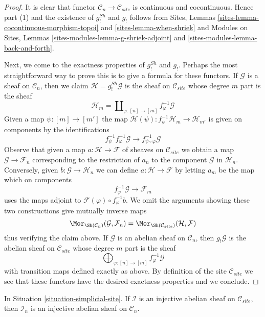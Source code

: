 \begin{proof}
It is clear that functor $\mathcal{C}_n \to \mathcal{C}_{site}$ is
continuous and cocontinuous. Hence part (1) and the existence
of $g^{Sh}_!$ and $g_!$ follows from
Sites, Lemmas \ref{sites-lemma-cocontinuous-morphism-topoi} and
\ref{sites-lemma-when-shriek}
and
Modules on Sites, Lemmas \ref{sites-modules-lemma-g-shriek-adjoint} and
\ref{sites-modules-lemma-back-and-forth}.

\medskip\noindent
Next, we come to the exactness properties of $g^{Sh}_!$ and $g_!$.
Perhaps the most straightforward way to prove this is to give a formula
for these functors. If $\mathcal{G}$ is a sheaf on $\mathcal{C}_n$,
then we claim $\mathcal{H} = g^{Sh}_!\mathcal{G}$ is the sheaf on
$\mathcal{C}_{site}$ whose degree $m$ part is the sheaf
$$
\mathcal{H}_m = \coprod\nolimits_{\varphi : [n] \to [m]}
f_\varphi^{-1}\mathcal{G}
$$
Given a map $\psi : [m] \to [m']$ the map
$\mathcal{H}(\psi) : f_\psi^{-1}\mathcal{H}_m \to \mathcal{H}_{m'}$
is given on components by the identifications
$$
f_\psi^{-1} f_\varphi^{-1} \mathcal{G} \to
f_{\psi \circ \varphi}^{-1}\mathcal{G}
$$
Observe that given a map $a : \mathcal{H} \to \mathcal{F}$ of sheaves on
$\mathcal{C}_{site}$ we obtain a map $\mathcal{G} \to \mathcal{F}_n$
corresponding to the restriction of $a_n$ to the component
$\mathcal{G}$ in $\mathcal{H}_n$. Conversely, given
$b : \mathcal{G} \to \mathcal{H}_n$ we can define
$a : \mathcal{H} \to \mathcal{F}$ by letting $a_m$ be the map which
on components
$$
f_\varphi^{-1}\mathcal{G} \to \mathcal{F}_m
$$
uses the maps adjoint to $\mathcal{F}(\varphi) \circ f_\varphi^{-1}b$.
We omit the arguments showing these two constructions give
mutually inverse maps
$$
\Mor_{\Sh(\mathcal{C}_n)}(\mathcal{G}, \mathcal{F}_n) =
\Mor_{\Sh(\mathcal{C}_{site})}(\mathcal{H}, \mathcal{F})
$$
thus verifying the claim above.
If $\mathcal{G}$ is an abelian sheaf on $\mathcal{C}_n$,
then $g_!\mathcal{G}$ is the abelian sheaf on $\mathcal{C}_{site}$
whose degree $m$ part is the sheaf
$$
\bigoplus\nolimits_{\varphi : [n] \to [m]} f_\varphi^{-1}\mathcal{G}
$$
with transition maps defined exactly as above. By definition of the
site $\mathcal{C}_{site}$ we see that these functors have the desired
exactness properties and we conclude.
\end{proof}

\begin{lemma}
\label{lemma-restriction-injective-to-component-site}
In Situation \ref{situation-simplicial-site}. If $\mathcal{I}$ is an
injective abelian sheaf on $\mathcal{C}_{site}$, then $\mathcal{I}_n$ is an
injective abelian sheaf on $\mathcal{C}_n$.
\end{lemma}

